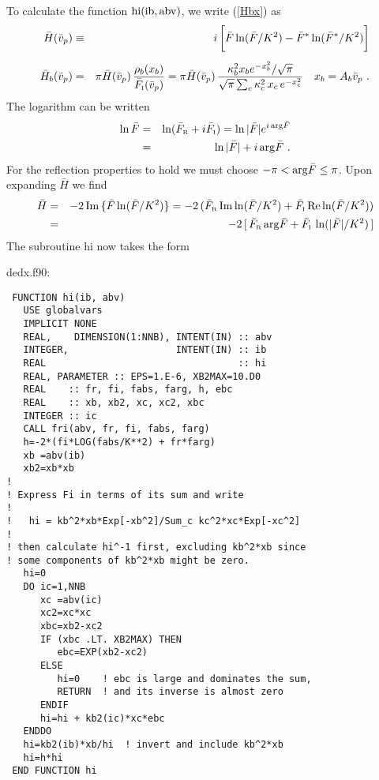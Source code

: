 \documentclass[preprint,12pt,eqsecnum,nofootinbib,amsmath,amssymb]{revtex4}
\newcommand{\smI}{{\rm\scriptscriptstyle I}}
\newcommand{\smR}{{\rm\scriptscriptstyle R}}
\begin{document}
To calculate the function ${\rm hi}({\rm ib},{\rm abv})$,
we write (\ref{Hbx}) as
\begin{eqnarray}
  \bar H(\bar v_p) &\equiv&  i \,\bigg[ \bar F \ln(\bar F/K^2) - 
  \bar F^*\ln(\bar F^*/K^2) \bigg]
\\[5pt]
\label{hbsimp}
  \bar H_b(\bar v_p) &=& \pi \bar H(\bar v_p) \, 
  \frac{\rho_b(x_b)}{\bar F_\smI(\bar v_p)}
 = \pi \bar H(\bar v_p) \, \frac{\kappa_b^2 x_b e^{-x_b^2}/
  \sqrt{\pi}}{\sqrt{\pi} \sum_c \kappa_c^2\, x_c\, 
  e^{-x_c^2} }
  ~~~ x_b = A_b \bar v_p \ .
\end{eqnarray}
The logarithm can be written
\begin{eqnarray}
\nonumber
  \ln \bar F &=& \ln( \bar F_\smR + i \bar F_\smI) = 
  \ln|\bar F|e^{i\,{\rm arg} \bar F}
\\
  &=& \ln|\bar F| + i \, {\rm arg} \bar F \ .
\end{eqnarray}
For the reflection properties to hold we must choose 
$-\pi < {\rm arg}\bar F \le \pi$. Upon expanding $\bar H$ 
we find
\begin{eqnarray}
\nonumber
  \bar H 
  &=&  
  -2\, {\rm Im}\, \{ \bar F \ln(\bar F/K^2) \}
  =  -2\, (\bar F_\smR\, {\rm Im}\ln(\bar F/K^2)
  + \bar F_\smI\, {\rm Re} \ln(\bar F/K^2) )
\\
  &=&
  -2\, [\, \bar F_\smR\, {\rm arg}\bar F
  + \bar F_\smI\,\ln(|\bar F|/K^2) \, ]
\nonumber
\end{eqnarray}
The subroutine hi now takes the form

\vskip0.5cm 
{
\noindent
dedx.f90:
\baselineskip12pt
\begin{verbatim}
 FUNCTION hi(ib, abv)
   USE globalvars
   IMPLICIT NONE
   REAL,    DIMENSION(1:NNB), INTENT(IN) :: abv
   INTEGER,                   INTENT(IN) :: ib
   REAL                                  :: hi
   REAL, PARAMETER :: EPS=1.E-6, XB2MAX=10.D0
   REAL    :: fr, fi, fabs, farg, h, ebc
   REAL    :: xb, xb2, xc, xc2, xbc
   INTEGER :: ic
   CALL fri(abv, fr, fi, fabs, farg)
   h=-2*(fi*LOG(fabs/K**2) + fr*farg)
   xb =abv(ib)
   xb2=xb*xb
!
! Express Fi in terms of its sum and write 
!
!   hi = kb^2*xb*Exp[-xb^2]/Sum_c kc^2*xc*Exp[-xc^2]
!
! then calculate hi^-1 first, excluding kb^2*xb since
! some components of kb^2*xb might be zero.
   hi=0                                       
   DO ic=1,NNB                               
      xc =abv(ic)                             
      xc2=xc*xc                              
      xbc=xb2-xc2                            
      IF (xbc .LT. XB2MAX) THEN                
         ebc=EXP(xb2-xc2)                    
      ELSE                                   
         hi=0    ! ebc is large and dominates the sum, 
         RETURN  ! and its inverse is almost zero
      ENDIF
      hi=hi + kb2(ic)*xc*ebc                 
   ENDDO
   hi=kb2(ib)*xb/hi  ! invert and include kb^2*xb
   hi=h*hi
 END FUNCTION hi
\end{verbatim}
}
\end{document}
